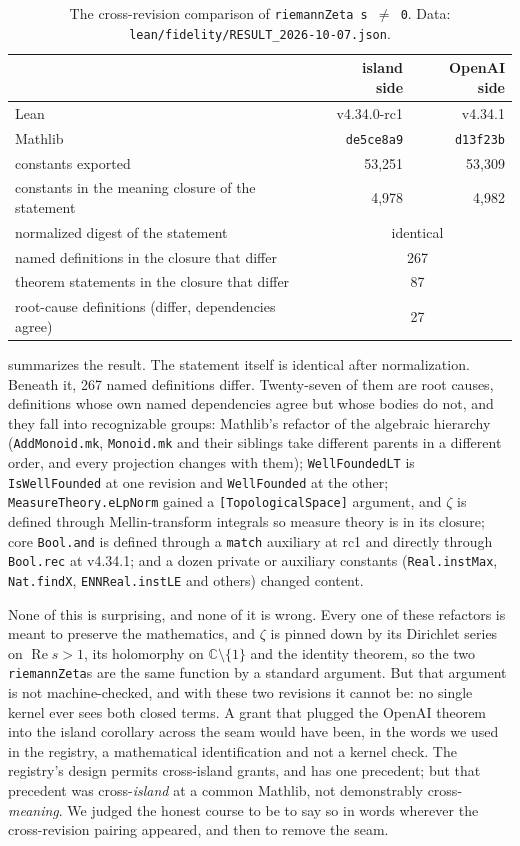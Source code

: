 \documentclass[11pt]{article}
\theoremstyle{definition}
\newcommand{\lean}[1]{\texttt{#1}}
\newcommand{\re}{\operatorname{Re}}
\newcommand{\C}{\mathbb{C}}
\begin{document}
\begin{table}[h]\centering\small
\begin{tabular}{lrr}
\toprule
 & island side & OpenAI side \\
\midrule
Lean & v4.34.0-rc1 & v4.34.1 \\
Mathlib & \lean{de5ce8a9} & \lean{d13f23b} \\
constants exported & 53,251 & 53,309 \\
constants in the meaning closure of the statement & 4,978 & 4,982 \\
\midrule
normalized digest of the statement & \multicolumn{2}{c}{identical} \\
named definitions in the closure that differ & \multicolumn{2}{c}{267} \\
theorem statements in the closure that differ & \multicolumn{2}{c}{87} \\
root-cause definitions (differ, dependencies agree) & \multicolumn{2}{c}{27} \\
\bottomrule
\end{tabular}
\caption{The cross-revision comparison of \lean{riemannZeta s $\neq$ 0}. Data: \lean{lean/fidelity/RESULT\_2026-10-07.json}.}
\label{tab:fidelity}
\end{table}

 summarizes the result. The statement itself is identical after normalization. Beneath it, 267 named definitions differ. Twenty-seven of them are root causes, definitions whose own named dependencies agree but whose bodies do not, and they fall into recognizable groups: Mathlib's refactor of the algebraic hierarchy (\lean{AddMonoid.mk}, \lean{Monoid.mk} and their siblings take different parents in a different order, and every projection changes with them); \lean{WellFoundedLT} is \lean{IsWellFounded} at one revision and \lean{WellFounded} at the other; \lean{MeasureTheory.eLpNorm} gained a \lean{[TopologicalSpace]} argument, and $\zeta$ is defined through Mellin-transform integrals so measure theory is in its closure; core \lean{Bool.and} is defined through a \lean{match} auxiliary at rc1 and directly through \lean{Bool.rec} at v4.34.1; and a dozen private or auxiliary constants (\lean{Real.instMax}, \lean{Nat.findX}, \lean{ENNReal.instLE} and others) changed content.

None of this is surprising, and none of it is wrong. Every one of these refactors is meant to preserve the mathematics, and $\zeta$ is pinned down by its Dirichlet series on $\re s > 1$, its holomorphy on $\C \setminus \{1\}$ and the identity theorem, so the two \lean{riemannZeta}s are the same function by a standard argument. But that argument is not machine-checked, and with these two revisions it cannot be: no single kernel ever sees both closed terms. A grant that plugged the OpenAI theorem into the island corollary across the seam would have been, in the words we used in the registry, a mathematical identification and not a kernel check. The registry's design permits cross-island grants, and has one precedent; but that precedent was cross-\emph{island} at a common Mathlib, not demonstrably cross-\emph{meaning}. We judged the honest course to be to say so in words wherever the cross-revision pairing appeared, and then to remove the seam.
\end{document}
